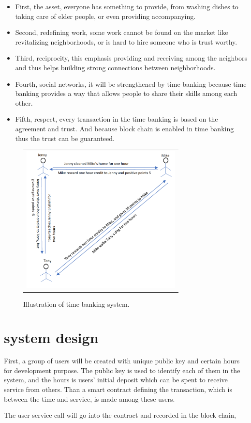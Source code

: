\documentclass{article}
\begin{document}
\begin{itemize}
   \item First, the asset, everyone has something to provide, from washing dishes to taking care of elder people, or even providing accompanying. 
   \item Second, redefining work, some work cannot be found on the market like revitalizing neighborhoods, or is hard to hire someone who is trust worthy. 
   \item Third, reciprocity, this emphasis providing and receiving among the neighbors and thus helps building strong connections between neighborhoods. 
   \item Fourth, social networks, it will be strengthened by time banking because time banking provides a way that allows people to share their skills among each other. 
   \item Fifth, respect, every transaction in the time banking is based on the agreement and trust. And because block chain is enabled in time banking thus the trust can be guaranteed. 
 \end{itemize}

\begin{figure} [t]
\begin{center}
\begin{tabular}{c}
\includegraphics[height=7.5cm]{time_bank_picture}
\end{tabular}
\end{center}
\caption[example] {\label{fig:1-time banking} Illustration of time banking system.}
\vspace{-10pt}
\end{figure}

\section{system design}
 First, a group of users will be created with unique public key and certain hours for development purpose. The public key is used to identify each of them in the system, and the hours is users' initial deposit which can be spent to receive service from others.  Than a smart contract defining the transaction, which is between the time and service, is made among these users.
 
The user service call will go into the contract and recorded in the block chain, 



\end{document}
